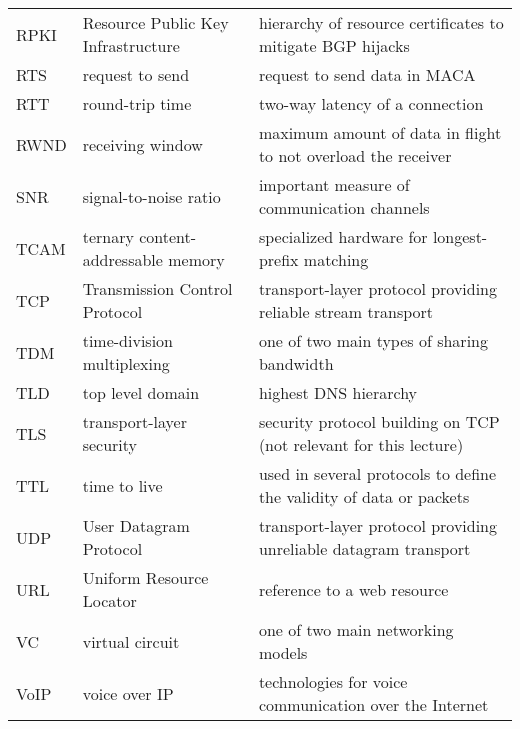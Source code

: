 \begin{longtable}{p{1.7cm} | p{5cm} | p{8cm}}
    RPKI    & Resource Public Key Infrastructure          & hierarchy of resource certificates to mitigate BGP hijacks                                          \\
    RTS     & request to send                             & request to send data in MACA                                                                        \\
    RTT     & round-trip time                             & two-way latency of a connection                                                                     \\
    RWND    & receiving window                            & maximum amount of data in flight to not overload the receiver                                       \\
    SNR     & signal-to-noise ratio                       & important measure of communication channels                                                         \\
    TCAM    & ternary content-addressable memory          & specialized hardware for longest-prefix matching                                                    \\
    TCP     & Transmission Control Protocol               & transport-layer protocol providing reliable stream transport                                        \\
    TDM     & time-division multiplexing                  & one of two main types of sharing bandwidth                                                          \\
    TLD     & top level domain                            & highest DNS hierarchy                                                                               \\
    TLS     & transport-layer security                    & security protocol building on TCP (not relevant for this lecture)                                 \\
    TTL     & time to live                                & used in several protocols to define the validity of data or packets                                 \\
    UDP     & User Datagram Protocol                      & transport-layer protocol providing unreliable datagram transport                                  \\
    URL     & Uniform Resource Locator                    & reference to a web resource                                                                         \\
    VC      & virtual circuit                             & one of two main networking models                                                                   \\
    VoIP    & voice over IP                               & technologies for voice communication over the Internet                                              \\
\end{longtable}

